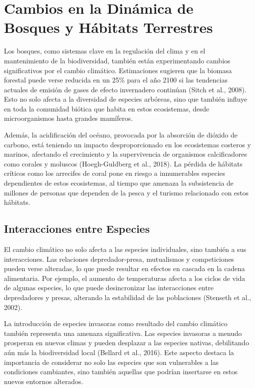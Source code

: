 \documentclass[
  letterpaper,
  DIV=11,
  numbers=noendperiod,
  oneside]{scrreprt}
\begin{document}
\section{Cambios en la Dinámica de Bosques y Hábitats
Terrestres}\label{cambios-en-la-dinuxe1mica-de-bosques-y-huxe1bitats-terrestres}

Los bosques, como sistemas clave en la regulación del clima y en el
mantenimiento de la biodiversidad, también están experimentando cambios
significativos por el cambio climático. Estimaciones sugieren que la
biomasa forestal puede verse reducida en un 25\% para el año 2100 si las
tendencias actuales de emisión de gases de efecto invernadero continúan
(Sitch et al., 2008). Esto no solo afecta a la diversidad de especies
arbóreas, sino que también influye en toda la comunidad biótica que
habita en estos ecosistemas, desde microorganismos hasta grandes
mamíferos.

Además, la acidificación del océano, provocada por la absorción de
dióxido de carbono, está teniendo un impacto desproporcionado en los
ecosistemas costeros y marinos, afectando el crecimiento y la
supervivencia de organismos calcificadores como corales y moluscos
(Hoegh-Guldberg et al., 2018). La pérdida de hábitats críticos como los
arrecifes de coral pone en riesgo a innumerables especies dependientes
de estos ecosistemas, al tiempo que amenaza la subsistencia de millones
de personas que dependen de la pesca y el turismo relacionado con estos
hábitats.

\subsection{Interacciones entre
Especies}\label{interacciones-entre-especies}

El cambio climático no solo afecta a las especies individuales, sino
también a sus interacciones. Las relaciones depredador-presa,
mutualismos y competiciones pueden verse alteradas, lo que puede
resultar en efectos en cascada en la cadena alimentaria. Por ejemplo, el
aumento de temperaturas afecta a los ciclos de vida de algunas especies,
lo que puede desincronizar las interacciones entre depredadores y
presas, alterando la estabilidad de las poblaciones (Stenseth et al.,
2002).

La introducción de especies invasoras como resultado del cambio
climático también representa una amenaza significativa. Las especies
invasoras a menudo prosperan en nuevos climas y pueden desplazar a las
especies nativas, debilitando aún más la biodiversidad local (Bellard et
al., 2016). Este aspecto destaca la importancia de considerar no solo
las especies que son vulnerables a las condiciones cambiantes, sino
también aquellas que podrían insertarse en estos nuevos entornos
alterados.
\end{document}
